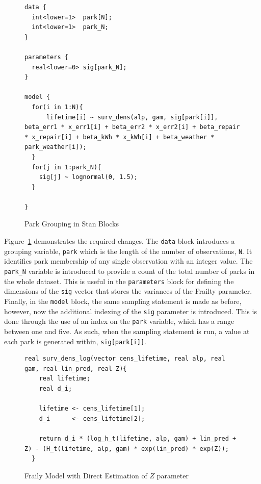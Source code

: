 \begin{figure}[htbp]
    \centering
    \begin{lstlisting}[belowskip=-2 \baselineskip]
data {
  int<lower=1>  park[N];
  int<lower=1>  park_N;
}

parameters {
  real<lower=0> sig[park_N];
}

model {
  for(i in 1:N){
      lifetime[i] ~ surv_dens(alp, gam, sig[park[i]], beta_err1 * x_err1[i] + beta_err2 * x_err2[i] + beta_repair * x_repair[i] + beta_kWh * x_kWh[i] + beta_weather * park_weather[i]);
  }
  for(j in 1:park_N){
    sig[j] ~ lognormal(0, 1.5);
  }

}
\end{lstlisting}
    \caption{Park Grouping in Stan Blocks}
    \label{park_group}
\end{figure}


Figure~\ref{park_group} demonstrates the required changes. The \lstinline{data} block introduces a grouping variable, \lstinline{park} which is the length of the number of observations, \lstinline{N}. It identifies park membership of any single observation with an integer value. The \lstinline{park_N} variable is introduced to provide a count of the total number of parks in the whole dataset. This is useful in the \lstinline{parameters} block for defining the dimensions of the \lstinline{sig} vector that stores the variances of the Frailty parameter. Finally, in the \lstinline{model} block, the same sampling statement is made as before, however, now the additional indexing of the \lstinline{sig} parameter is introduced. This is done through the use of an index on the \lstinline{park} variable, which has a range between one and five. As such, when the sampling statement is run, a value at each park is generated within, \lstinline{sig[park[i]]}.


\begin{figure}[htbp]
    \centering
    \begin{lstlisting}[belowskip=-2 \baselineskip]
  real surv_dens_log(vector cens_lifetime, real alp, real gam, real lin_pred, real Z){
    real lifetime;
    real d_i;
  
    lifetime <- cens_lifetime[1];
    d_i      <- cens_lifetime[2];
  
    return d_i * (log_h_t(lifetime, alp, gam) + lin_pred + Z) - (H_t(lifetime, alp, gam) * exp(lin_pred) * exp(Z));
  }
\end{lstlisting}
    \caption{Fraily Model with Direct Estimation of $Z$ parameter}
    \label{z_lik}
\end{figure}


